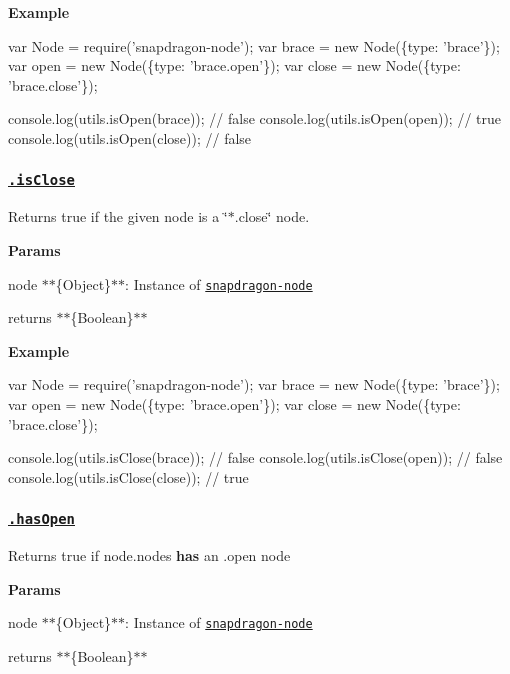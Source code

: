 {\bfseries Example}


\begin{DoxyCode}
var Node = require('snapdragon-node');
var brace = new Node(\{type: 'brace'\});
var open = new Node(\{type: 'brace.open'\});
var close = new Node(\{type: 'brace.close'\});

console.log(utils.isOpen(brace)); // false
console.log(utils.isOpen(open)); // true
console.log(utils.isOpen(close)); // false
\end{DoxyCode}


\subsubsection*{\href{index.js#L607}{\tt .is\+Close}}

Returns true if the given node is a \char`\"{}$\ast$.\+close\char`\"{} node.

{\bfseries Params}


\begin{DoxyItemize}
\item {\ttfamily node} $\ast$$\ast$\{Object\}$\ast$$\ast$\+: Instance of \href{https://github.com/jonschlinkert/snapdragon-node}{\tt snapdragon-\/node}
\item {\ttfamily returns} $\ast$$\ast$\{Boolean\}$\ast$$\ast$
\end{DoxyItemize}

{\bfseries Example}


\begin{DoxyCode}
var Node = require('snapdragon-node');
var brace = new Node(\{type: 'brace'\});
var open = new Node(\{type: 'brace.open'\});
var close = new Node(\{type: 'brace.close'\});

console.log(utils.isClose(brace)); // false
console.log(utils.isClose(open)); // false
console.log(utils.isClose(close)); // true
\end{DoxyCode}


\subsubsection*{\href{index.js#L633}{\tt .has\+Open}}

Returns true if {\ttfamily node.\+nodes} {\bfseries has} an {\ttfamily .open} node

{\bfseries Params}


\begin{DoxyItemize}
\item {\ttfamily node} $\ast$$\ast$\{Object\}$\ast$$\ast$\+: Instance of \href{https://github.com/jonschlinkert/snapdragon-node}{\tt snapdragon-\/node}
\item {\ttfamily returns} $\ast$$\ast$\{Boolean\}$\ast$$\ast$
\end{DoxyItemize}

